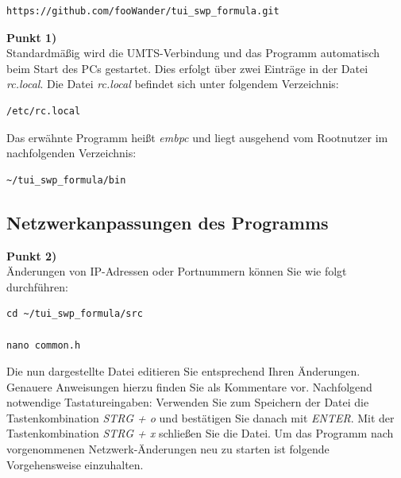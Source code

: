 \documentclass[fontsize = 12pt, paper = a4]{scrreprt}
\begin{document}
 \begin{lstlisting}[frame=single]
 https://github.com/fooWander/tui_swp_formula.git 
 \end{lstlisting}

\vspace*{-2mm} 

\textbf{Punkt 1)} \\

Standardmäßig wird die UMTS-Verbindung und das Programm automatisch beim Start des PCs gestartet.
Dies erfolgt über zwei Einträge in der Datei \textit{rc.local}.
Die Datei \textit{rc.local} befindet sich unter folgendem Verzeichnis:

\vspace*{4mm}
\begin{lstlisting}[frame=single]
/etc/rc.local
\end{lstlisting} 
\vspace*{-2mm}


Das erwähnte Programm heißt \textit{embpc} und liegt ausgehend vom Rootnutzer im nachfolgenden Verzeichnis:

\vspace*{4mm}
\begin{lstlisting}[frame=single]
~/tui_swp_formula/bin
\end{lstlisting} 
\vspace*{-2mm}


\subsection{Netzwerkanpassungen des Programms}

\textbf{Punkt 2)} \\

Änderungen von IP-Adressen oder Portnummern können Sie wie folgt durchführen:

\vspace*{4mm}
\begin{lstlisting}[frame=single]
cd ~/tui_swp_formula/src

nano common.h
\end{lstlisting} 
\vspace*{-2mm}

Die nun dargestellte Datei editieren Sie entsprechend Ihren Änderungen. Genauere Anweisungen hierzu finden Sie als Kommentare vor.
Nachfolgend notwendige Tastatureingaben:
Verwenden Sie zum Speichern der Datei die Tastenkombination \textit{STRG + o} und bestätigen Sie danach mit \textit{ENTER}. Mit der Tastenkombination \textit{STRG + x} schließen Sie die Datei.
Um das Programm nach vorgenommenen Netzwerk-Änderungen neu zu starten ist folgende Vorgehensweise einzuhalten.
\end{document}
